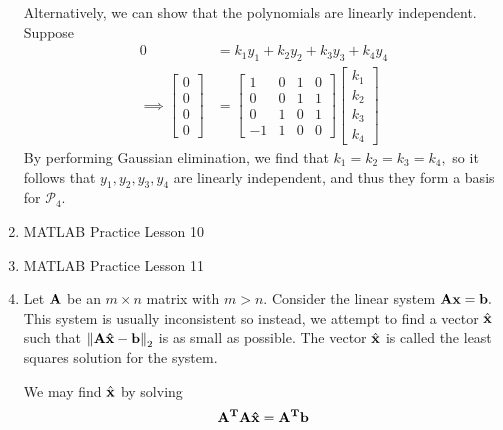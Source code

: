 \documentclass{article}
\begin{document}
\begin{enumerate}
\begin{soln}
			Alternatively, we can show that the polynomials are linearly independent. Suppose
			\begin{align*}
				0 &= k_1y_1+k_2y_2+k_3y_3+k_4y_4 \\
				\implies \begin{bmatrix}
					0 \\ 0 \\ 0 \\ 0
				\end{bmatrix} &= \begin{bmatrix}
					1 & 0 & 1 & 0 \\
					0 & 0 & 1 & 1 \\
					0 & 1 & 0 & 1 \\
					-1 & 1 & 0 & 0
				\end{bmatrix}\begin{bmatrix}
					k_1 \\ k_2 \\ k_3 \\ k_4
				\end{bmatrix}
			\end{align*}
			By performing Gaussian elimination, we find that $k_1=k_2=k_3=k_4,$ so it follows that $y_1, y_2, y_3, y_4$ are linearly independent, and thus they form a basis for $\mathcal P_4.$
		\end{soln}

	\item MATLAB Practice Lesson 10

	\item MATLAB Practice Lesson 11

	\item Let $\bf A$ be an $m\times n$ matrix with $m>n.$ Consider the linear system $\bf{Ax} = \bf b.$ This system is usually inconsistent so instead, we attempt to find a vector $\hat{\bf x}$ such that $\left\lVert \bf{A\hat{x}}-\bf{b} \right\rVert_2$ is as small as possible. The vector $\hat{\bf x}$ is called the least squares solution for the system.
		\begin{itemize}
				\ii We may find $\hat{\bf {x}}$ by solving 
				\begin{align*}
					\bf{A}^T \bf{A\hat{x}} = \bf{A}^T\bf{b}
				\end{align*}


\end{itemize}
\end{enumerate}
\end{document}

